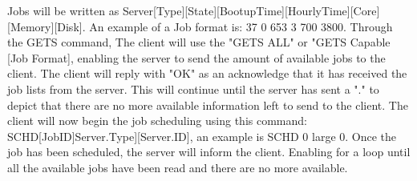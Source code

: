 \documentclass[a4paper]{article} %
\begin{document}
Jobs will be written as Server[Type][State][BootupTime][HourlyTime][Core][Memory][Disk]. An example of a Job format is: 37 0 653 3 700 3800. Through the GETS command, The client will use the "GETS ALL" or "GETS Capable [Job Format], enabling the server to send the amount of available jobs to the client. The client will reply with "OK" as an acknowledge that it has received the job lists from the server. This will continue until the server has sent a "." to depict that there are no more available information left to send to the client. The client will now begin the job scheduling using this command: SCHD[JobID]Server.Type][Server.ID], an example is SCHD 0 large 0. Once the job has been scheduled, the server will inform the client. Enabling for a loop until all the available jobs have been read and there are no more available.
\end{document}
